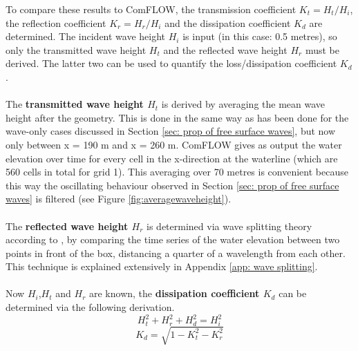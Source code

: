 To compare these results to ComFLOW, the transmission coefficient $K_t = H_t / H_i$, the reflection coefficient $K_r = H_r / H_i$ and the dissipation coefficient $K_d$ are determined. The incident wave height $H_i$ is input (in this case: 0.5 metres), so only the transmitted wave height $H_t$ and the reflected wave height $H_r$ must be derived. The latter two can be used to quantify the loss/dissipation coefficient $K_d$.\\
\\
The \textbf{transmitted wave height $H_t$} is derived by averaging the mean wave height after the geometry. This is done in the same way as has been done for the wave-only cases discussed in Section \ref{sec: prop of free surface waves}, but now only between x = 190 m and x = 260 m. ComFLOW gives as output the water elevation over time for every cell in the x-direction at the waterline (which are 560 cells in total for grid 1). This averaging over 70 metres is convenient because this way the oscillating behaviour observed in Section \ref{sec: prop of free surface waves} is filtered (see Figure \ref{fig:averagewaveheight}). \\
\\
The \textbf{reflected wave height $H_r$} is determined via wave splitting theory according to \citet{Goda1976}, by comparing the time series of the water elevation between two points in front of the box, distancing a quarter of a wavelength from each other. This technique is explained extensively in Appendix \ref{app: wave splitting}.\\
\\
Now $H_i$,$H_t$ and $H_r$ are known, the \textbf{dissipation coefficient $K_d$} can be determined via the following derivation.
\begin{equation}
    H_t^2+H_r^2+H_d^2=H_i^2
\end{equation}
\begin{equation}
    K_d = \sqrt{1-K_t^2-K_r^2}
\end{equation}





